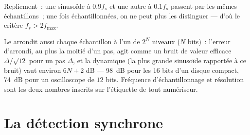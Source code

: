 \begin{omfigure}

{\small Repliement~: une sinusoïde à $0.9f_s$ et une autre à $0.1f_s$ passent par
les mêmes échantillons~; une fois échantillonnées, on ne peut plus les distinguer --- d'où le
critère $f_s > 2f_{\max}$.}
\end{omfigure}

\begin{remark}[Quantification]\label{rem:b2:feedback-oscillators:quantization}
Le  arrondit aussi chaque échantillon à l'un de
$2^N$ niveaux ($N$ bits)~: l'erreur d'arrondi, au plus la moitié d'un pas, agit
comme un bruit de valeur efficace $\Delta/\sqrt{12}$ pour un pas $\Delta$, et la
dynamique (la plus grande sinusoïde rapportée à ce bruit) vaut environ $6N + 2$ dB ---
\qty{98}{dB} pour les $16$ bits d'un disque compact, \qty{74}{dB} pour un
oscilloscope de $12$ bits. Fréquence d'échantillonnage et résolution sont les deux nombres inscrits sur
l'étiquette de tout numériseur.
\end{remark}

\section{La détection synchrone}

